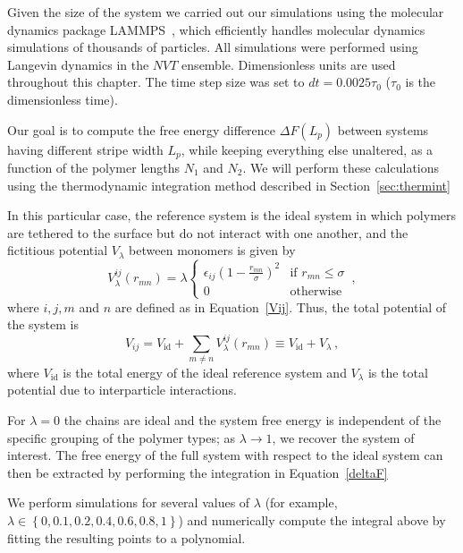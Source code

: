 Given the size of the system we carried out our simulations using the  molecular dynamics package  {\sc LAMMPS}~\cite{lammps}, which efficiently handles molecular dynamics simulations of thousands of particles.
All simulations were performed using Langevin dynamics in the $NVT$ ensemble.
Dimensionless units are used throughout this chapter. The time step size was set to $dt=0.0025\tau_0$ ($\tau_0$ is the dimensionless time).

Our goal is to compute the free energy difference $\Delta F(L_p)$ between systems having different stripe width $L_p$, while keeping
everything else unaltered, as a function of the polymer lengths $N_1$ and $N_2$.
We will perform these calculations using the thermodynamic integration method described in Section~\ref{sec:thermint}

In this particular case, the reference system is the ideal system in which polymers are tethered to the surface but do not interact with one another, and the fictitious potential $V_\lambda$ between monomers is given by
\begin{equation}
V^{ij}_{\lambda}(r_{mn}) = \lambda
	\begin{cases}
		\epsilon_{ij} \left(1-\frac{r_{mn}}{\sigma}\right)^2 & \textrm{if } r_{mn} \leq \sigma \\
		0 & \textrm{otherwise}
	\end{cases} \,,
\end{equation}
where $i, j, m$ and $n$ are defined as in Equation~\ref{Vij}.
Thus, the total potential of the system is
\begin{equation}
	V_{ij} = V_{\textrm{id}} + \sum_{m \neq n} V_\lambda^{ij}(r_{mn})  \equiv V_{\textrm {id}} + V_\lambda \,,
\end{equation}
where $V_{\textrm{id}}$ is the total energy of the ideal reference system and $V_\lambda$ is the total potential due to interparticle interactions.

For $\lambda=0$ the chains are ideal and the system free energy is independent of
the specific grouping of the polymer types;  as $\lambda\rightarrow 1$, we recover the system of interest. 
The free energy of the full system with respect to the ideal system can then be extracted by performing the integration in Equation~\ref{deltaF}

We perform simulations for several values of $\lambda$ (for example, $\lambda \in \left\{0,0.1,0.2,0.4,0.6,0.8,1\right\}$) and numerically compute the integral above by fitting the resulting points to a polynomial. 

